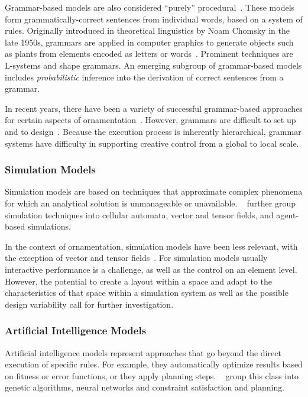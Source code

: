 Grammar-based models are also considered ``purely'' procedural~\cite{smelik_2014_aso}. These models form grammatically-correct sentences from individual words, based on a system of rules. Originally introduced in theoretical linguistics by Noam Chomsky in the late 1950s, grammars are applied in computer graphics to generate objects such as plants from elements encoded as letters or words~\cite{hendrikx_2013_pcg}. Prominent techniques are L-systems and shape grammars. An emerging subgroup of grammar-based models includes \textit{probabilistic} inference into the derivation of correct sentences from a grammar.

In recent years, there have been a variety of successful grammar-based approaches for certain aspects of ornamentation~\cite{benes_2011_gpm,talton_2011_mpm,ritchie_2015_cpm}. However, grammars are difficult to set up and to design~\cite{stava_2010_ipm}. Because the execution process is inherently hierarchical, grammar systems have difficulty in supporting creative control from a global to local scale.

\subsubsection{Simulation Models}
\label{subsubsec:models_simulation}

Simulation models are based on techniques that approximate complex phenomena for which an analytical solution is unmanageable or unavailable. \citeauthor*{hendrikx_2013_pcg}~\cite{hendrikx_2013_pcg} further group simulation techniques into cellular automata, vector and tensor fields, and agent-based simulations. 

In the context of ornamentation, simulation models have been less relevant, with the exception of vector and tensor fields~\cite{ijiri_2008_aeb,yuanyuan_2011_gso,saputra_2017_ffo}. For simulation models usually interactive performance is a challenge, as well as the control on an element level. However, the potential to create a layout within a space and adapt to the characteristics of that space within a simulation system as well as the possible design variability call for further investigation.


\subsubsection{Artificial Intelligence Models}
\label{subsubsec:models_ai}

Artificial intelligence models represent approaches that go beyond the direct execution of specific rules. For example, they automatically optimize results based on fitness or error functions, or they apply planning steps. \citeauthor*{hendrikx_2013_pcg}~\cite{hendrikx_2013_pcg} group this class into genetic algorithms, neural networks and constraint satisfaction and planning. 

